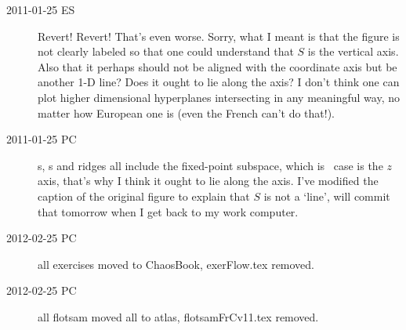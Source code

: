 \begin{description}
\item[2011-01-25 ES] Revert! Revert! That's even worse. Sorry, what I meant is that the
figure is not clearly labeled so that one could understand that $S$ is the
vertical axis. Also that it perhaps should not be aligned with the coordinate
axis but be another 1-D line? Does it ought to lie along the axis? I don't
think one can plot higher dimensional hyperplanes intersecting in any
meaningful way, no matter how European one is (even the French can't do that!).


\item[2011-01-25 PC] \Slice s, \sset s and ridges all include the
fixed-point subspace, which is \cLe\ case is the $z$ axis, that's why I
think it ought to lie along the axis. I've modified the caption of the
original figure to explain that $S$ is not a `line', will commit that
tomorrow when I get back to my work computer.

\item[2012-02-25 PC] all exercises moved to ChaosBook, exerFlow.tex
removed.

\item[2012-02-25 PC] all flotsam moved all to atlas, flotsamFrCv11.tex
removed.


\end{description}
